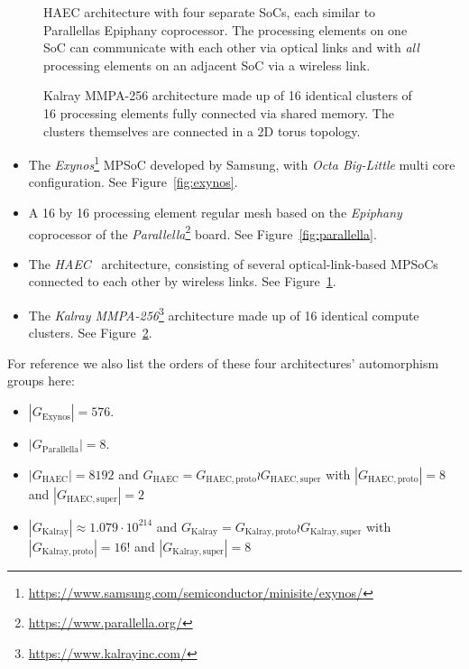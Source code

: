 \begin{figure}
  \centering
  \caption{HAEC architecture with four separate SoCs, each similar to
           Parallellas Epiphany coprocessor. The processing elements on one
           SoC can communicate with each other via optical links and with
           \textit{all} processing elements on an adjacent SoC via a wireless
           link.}
  \label{fig:haec}
\end{figure}

\begin{figure}
  \centering
  \caption{Kalray MMPA-256 architecture made up of 16 identical clusters of 16
           processing elements fully connected via shared memory. The clusters
           themselves are connected in a 2D torus topology.}
  \label{fig:kalray}
\end{figure}

\begin{itemize}
\item The
\textit{Exynos}\footnote{\hyperlink{https://www.samsung.com/semiconductor/minisite/exynos/}{https://www.samsung.com/semiconductor/minisite/exynos/}}
MPSoC developed by Samsung, with \textit{Octa Big-Little} multi core
configuration. See Figure~\ref{fig:exynos}.

\item A 16 by 16 processing element regular mesh based on the
\textit{Epiphany} \cite{Olofsson} coprocessor of the
\textit{Parallella}\footnote{\hyperlink{https://www.parallella.org/}{https://www.parallella.org/}}
board. See Figure~\ref{fig:parallella}.

\item The \textit{HAEC}~\cite{HAEC} architecture, consisting of several
optical-link-based MPSoCs connected to each other by wireless links. See
Figure~\ref{fig:haec}.

\item The \textit{Kalray
MMPA-256}\footnote{\hyperlink{https://www.kalrayinc.com/}{https://www.kalrayinc.com/}}
architecture made up of 16 identical compute clusters. See
Figure~\ref{fig:kalray}.
\end{itemize}
%
For reference we also list the orders of these four architectures' automorphism
groups here:
%
\begin{itemize}
\item $|G_{\mathrm{Exynos}}| = 576$.

\item $|G_{\mathrm{Parallella}}| = 8$.

\item $|G_{\mathrm{HAEC}}| = 8192$ and $G_{\mathrm{HAEC}} =
G_{\mathrm{HAEC,proto}} \wr G_{\mathrm{HAEC,super}}$ with
$|G_{\mathrm{HAEC,proto}}| = 8$ and $|G_{\mathrm{HAEC,super}}| = 2$

\item $|G_{\mathrm{Kalray}}| \approx 1.079 \cdot 10^{214}$ and
$G_{\mathrm{Kalray}} = G_{\mathrm{Kalray,proto}} \wr G_{\mathrm{Kalray,super}}$
with $|G_{\mathrm{Kalray,proto}}| = 16!$ and $|G_{\mathrm{Kalray,super}}| = 8$
\end{itemize}

